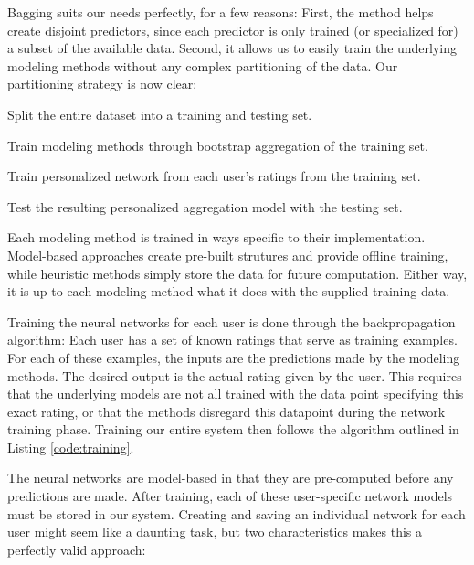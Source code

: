 Bagging suits our needs perfectly, for a few reasons: First, the method helps create disjoint predictors, 
since each predictor is only trained (or specialized for) a subset of the available data.
Second, it allows us to easily train the underlying modeling methods without any complex partitioning of the data.
Our partitioning strategy is now clear:

\begin{enumerate*}
  \item Split the entire dataset into a training and testing set.
  \item Train modeling methods through bootstrap aggregation of the training set.
  \item Train personalized network from each user's ratings from the training set.
  \item Test the resulting personalized aggregation model with the testing set.
\end{enumerate*}

Each modeling method is trained in ways specific to their implementation. 
Model-based approaches create pre-built strutures and provide offline training,
while heuristic methods simply store the data for future computation.
Either way, it is up to each modeling method what it does with the supplied training data.

Training the neural networks for each user is done through the backpropagation algorithm:
Each user has a set of known ratings that serve as training examples.
For each of these examples, the inputs are the predictions made by the modeling methods.
The desired output is the actual rating given by the user.
This requires that the underlying models are not all trained with the data point
specifying this exact rating, or that the methods disregard this datapoint during
the network training phase. Training our entire system then follows
the algorithm outlined in Listing \ref{code:training}.

\begin{figure*}
  
\end{figure*}

The neural networks are model-based in that they are pre-computed before any predictions are made.
After training, each of these user-specific network models must be stored in our system.
Creating and saving an individual network for each user might seem like a daunting task,
but two characteristics makes this a perfectly valid approach:


